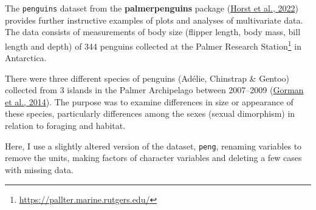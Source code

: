 \documentclass[
  letterpaper,
  10pt,
  krantz2]{krantz}
\providecommand{\href}[2]{#2\footnote{\url{#1}}}
\begin{document}
The \texttt{penguins} dataset from the \textbf{palmerpenguins} package
(\protect\hyperlink{ref-R-palmerpenguins}{Horst et al., 2022}) provides
further instructive examples of plots and analyses of multivariate data.
The data consists of measurements of body size (flipper length, body
mass, bill length and depth) of 344 penguins collected at the
\href{https://pallter.marine.rutgers.edu/}{Palmer Research Station} in
Antarctica.

There were three different species of penguins (Adélie, Chinstrap \&
Gentoo) collected from 3 islands in the Palmer Archipelago between
2007--2009 (\protect\hyperlink{ref-Gorman2014}{Gorman et al., 2014}).
The purpose was to examine differences in size or appearance of these
species, particularly differences among the sexes (sexual dimorphism) in
relation to foraging and habitat.

Here, I use a slightly altered version of the dataset, \texttt{peng},
renaming variables to remove the units, making factors of character
variables and deleting a few cases with missing data.
\end{document}
